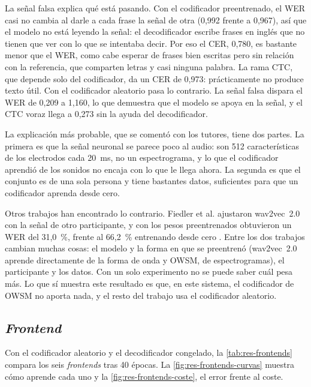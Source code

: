 La señal falsa explica qué está pasando. Con el codificador preentrenado, el WER casi no cambia al darle a cada frase la señal de otra (0,992 frente a 0,967), así que el modelo no está leyendo la señal: el decodificador escribe frases en inglés que no tienen que ver con lo que se intentaba decir. Por eso el CER, 0,780, es bastante menor que el WER, como cabe esperar de frases bien escritas pero sin relación con la referencia, que comparten letras y casi ninguna palabra. La rama CTC, que depende solo del codificador, da un CER de 0,973: prácticamente no produce texto útil. Con el codificador aleatorio pasa lo contrario. La señal falsa dispara el WER de 0,209 a 1,160, lo que demuestra que el modelo se apoya en la señal, y el CTC voraz llega a 0,273 sin la ayuda del decodificador.

La explicación más probable, que se comentó con los tutores, tiene dos partes. La primera es que la señal neuronal se parece poco al audio: son 512 características de los electrodos cada 20~ms, no un espectrograma, y lo que el codificador aprendió de los sonidos no encaja con lo que le llega ahora. La segunda es que el conjunto es de una sola persona y tiene bastantes datos, suficientes para que un codificador aprenda desde cero.

Otros trabajos han encontrado lo contrario. Fiedler et al. ajustaron wav2vec~2.0 con la señal de otro participante, y con los pesos preentrenados obtuvieron un WER del 31,0~\%, frente al 66,2~\% entrenando desde cero \cite{fiedler2025wav2vec2brain}. Entre los dos trabajos cambian muchas cosas: el modelo y la forma en que se preentrenó (wav2vec~2.0 aprende directamente de la forma de onda y OWSM, de espectrogramas), el participante y los datos. Con un solo experimento no se puede saber cuál pesa más. Lo que sí muestra este resultado es que, en este sistema, el codificador de OWSM no aporta nada, y el resto del trabajo usa el codificador aleatorio.

\subsection{\textit{Frontend}}
\label{sec:res-frontend}

Con el codificador aleatorio y el decodificador congelado, la \cref{tab:res-frontends} compara los seis \textit{frontends} tras 40 épocas. La \cref{fig:res-frontends-curvas} muestra cómo aprende cada uno y la \cref{fig:res-frontends-coste}, el error frente al coste.

